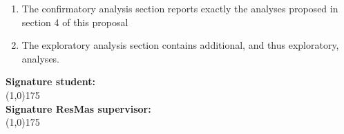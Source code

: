 \documentclass[12pt,a4paper]{article}\usepackage[]{graphicx}\usepackage[]{color}
\begin{document}
\begin{enumerate}
\item The confirmatory analysis section reports exactly the analyses proposed in section 4 of this proposal
\item The exploratory analysis section contains additional, and thus exploratory, analyses. 
\end{enumerate}

\noindent
\textbf{Signature student:} 
\vspace*{2\baselineskip} \\
\line(1,0){175} \\

\noindent
\textbf{Signature ResMas supervisor:}
\vspace*{2\baselineskip} \\
\line(1,0){175} \\

%
\end{document}
